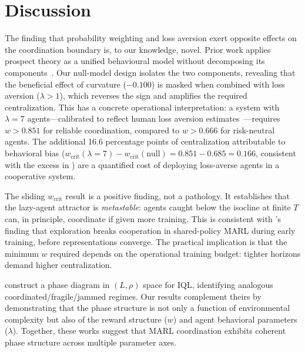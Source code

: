 \documentclass[11pt]{article}
\newcommand{\wcrit}{w_{\mathrm{crit}}}
\begin{document}
\section{Discussion}
\label{sec:discussion}

The finding that probability weighting and loss aversion exert opposite
effects on the coordination boundary is, to our knowledge, novel.
Prior work applies prospect theory as a unified behavioural model without
decomposing its components~\citep{lalmohammed2025,anon2024risk}.
Our null-model design isolates the two components, revealing that the
beneficial effect of curvature ($-0.100$) is masked when combined with
loss aversion ($\lambda{>}1$), which reverses the sign and amplifies the
required centralization.
This has a concrete operational interpretation: a system with $\lambda{=}7$
agents---calibrated to reflect human loss aversion
estimates~\citep{tversky1992}---requires $w > 0.851$ for reliable
coordination, compared to $w > 0.666$ for risk-neutral agents.
The additional 16.6 percentage points of centralization attributable to
behavioral bias ($\wcrit(\lambda{=}7) - \wcrit(\text{null}) =
0.851 - 0.685 = 0.166$, consistent with the excess in
) are a quantified cost of deploying loss-averse
agents in a cooperative system.

The sliding $\wcrit$ result is a positive finding, not a pathology.
It establishes that the lazy-agent attractor is \emph{metastable}: agents
caught below the isocline at finite $T$ can, in principle, coordinate if
given more training.
This is consistent with \citet{weng2026}'s finding that exploration breaks
cooperation in shared-policy MARL during early training, before
representations converge.
The practical implication is that the minimum $w$ required depends on the
operational training budget: tighter horizons demand higher centralization.

\citet{yamaguchi2025} construct a phase diagram in $(L, \rho)$ space for
IQL, identifying analogous coordinated/fragile/jammed regimes.
Our results complement theirs by demonstrating that the phase structure is
not only a function of environmental complexity but also of the reward
structure ($w$) and agent behavioral parameters ($\lambda$).
Together, these works suggest that MARL coordination exhibits coherent
phase structure across multiple parameter axes.
\end{document}
